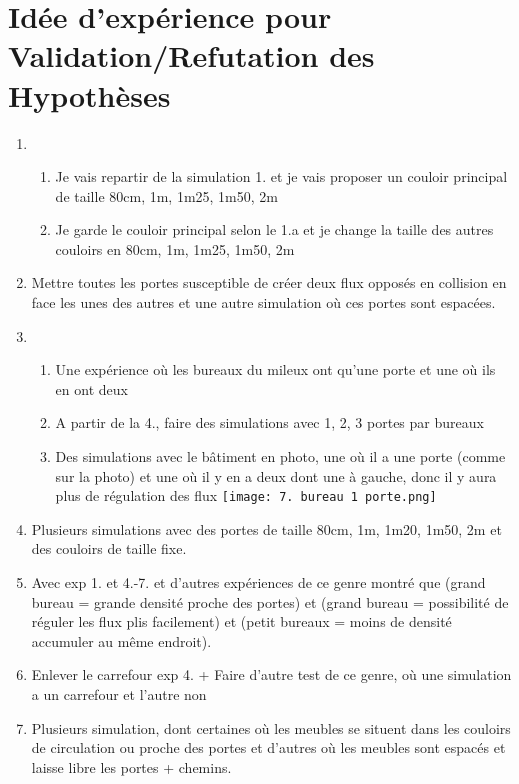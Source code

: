 \documentclass[12pt]{article}
\begin{document}
\section{Idée d'expérience pour Validation/Refutation des Hypothèses}

\begin{enumerate}

    \item
    \begin{enumerate}
        \item Je vais repartir de la simulation 1. et je vais proposer un couloir principal de taille 80cm, 1m, 1m25, 1m50, 2m
        \item Je garde le couloir principal selon le 1.a et je change la taille des autres couloirs en 80cm, 1m, 1m25, 1m50, 2m
    \end{enumerate}

    \item Mettre toutes les portes susceptible de créer deux flux opposés en collision en face les unes des autres et une autre simulation où ces portes sont espacées.
    
    \item 
    \begin{enumerate}
        \item Une expérience où les bureaux du mileux ont qu'une porte et une où ils en ont deux
        \item A partir de la 4., faire des simulations avec 1, 2, 3 portes par bureaux  
        \item Des simulations avec le bâtiment en photo, une où il a une porte (comme sur la photo) et une où il y en a deux dont une à gauche, donc il y aura plus de régulation des flux
        \newline\texttt{[image: 7. bureau 1 porte.png]}\newline
    \end{enumerate}

    \item Plusieurs simulations avec des portes de taille 80cm, 1m, 1m20, 1m50, 2m et des couloirs de taille fixe.
    
    \item Avec exp 1. et 4.-7. et d'autres expériences de ce genre montré que (grand bureau = grande densité proche des portes) et (grand bureau = possibilité de réguler les flux plis facilement) et (petit
    bureaux = moins de densité accumuler au même endroit).
    
    \item Enlever le carrefour exp 4. + Faire d'autre test de ce genre, où une simulation a un carrefour et l'autre non
    
    \item Plusieurs simulation, dont certaines où les meubles se situent dans les couloirs de circulation ou proche des portes et d'autres où les meubles sont espacés et laisse libre les portes + chemins.
    
    

\end{enumerate}
\end{document}
